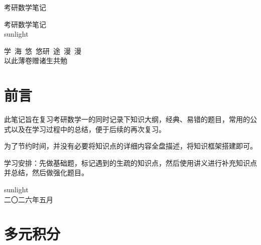 \documentclass[a4paper,12pt,oneside,fontset=none]{ctexbook}
\newcommand{\MakeTitlePage}{%
    \begin{titlepage}
        \centering
        \vspace*{5cm}
        
        {\fontsize{48pt}{60pt}\selectfont\heavykaishu \color{LogicColor} 考研数学笔记\par}
        
        \vfill
        
        {\LARGE \kaishu 
        考研数学笔记
        \\[0.8em]
        \Large
        sunlight
        \\
        }
    
        \vspace{2.3cm}
        
        {\Large \kaishu
        学\ 海\ 悠\ 悠\quad 研\ 途\ 漫\ 漫
        \\[0.3em]
        {\Large 以此薄卷赠诸生共勉}
        \\[2.5em]
        
        }
        
        \vspace{2cm}
    \end{titlepage}%
}
\numberwithin{equation}{chapter}
\begin{document}
\frontmatter

\MakeTitlePage



\chapter*{前言}
此笔记旨在复习考研数学一的同时记录下知识大纲，经典、易错的题目，常用的公式以及在学习过程中的总结，便于后续的再次复习。

为了节约时间，并没有必要将知识点的详细内容全盘描述，将知识框架搭建即可。

学习安排：先做基础题，标记遇到的生疏的知识点，然后使用讲义进行补充知识点并总结，然后做强化题目。




\vspace{3cm}

\hfill
\begin{minipage}{5cm}
    \centering
    sunlight \\
    二〇二六年五月\\
\end{minipage}


\tableofcontents

\mainmatter



\chapter{多元积分}
\end{document}
